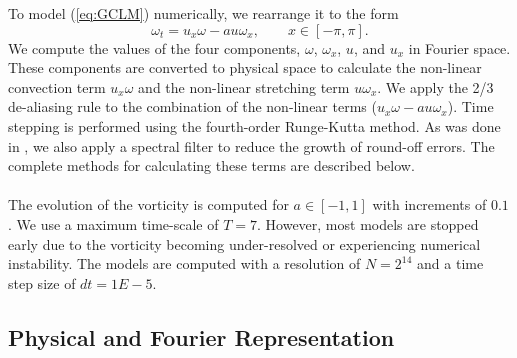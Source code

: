 \documentclass[12pt]{article}
\def\w{\omega}
\def\wt{\omega_t}
\def\wx{\omega_x}
\def\ux{u_x}
\numberwithin{equation}{section}
\begin{document}
To model (\ref{eq:GCLM}) numerically, we rearrange it to the form
\begin{equation}\label{eq:GCLM:Numerical}
\wt = \ux\w - au\wx, \qquad x\in[-\pi,\pi].
\end{equation}
We compute the values of the four components, $\w$, $\wx$, $u$, and $\ux$ in Fourier space. These components are converted to physical space to calculate the non-linear convection term $\ux\w$ and the non-linear stretching term $u\wx$. We apply the 2/3 de-aliasing rule to the combination of the non-linear terms ($\ux\w - au\wx$). Time stepping is performed using the fourth-order Runge-Kutta method. As was done in \cite{okamoto_generalization_2008}, we also apply a spectral filter to reduce the growth of round-off errors. The complete methods for calculating these terms are described below. 
\\~\\
The evolution of the vorticity is computed for $a\in[-1,1]$ with increments of $0.1$. We use a maximum time-scale of $T=7$. However, most models are stopped early due to the vorticity becoming under-resolved or experiencing numerical instability. The models are computed with a resolution of $N=2^{14}$ and a time step size of $dt=1E-5$. 

\subsection{Physical and Fourier Representation}
\end{document}
